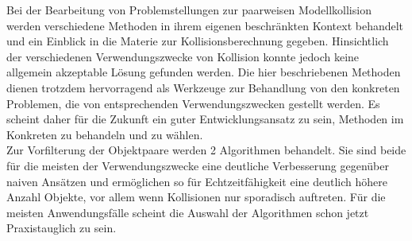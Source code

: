 
Bei der Bearbeitung von Problemstellungen zur paarweisen Modellkollision werden verschiedene Methoden in ihrem eigenen beschränkten Kontext behandelt und ein Einblick in die Materie zur Kollisionsberechnung gegeben. Hinsichtlich der verschiedenen Verwendungszwecke von Kollision konnte jedoch keine allgemein akzeptable Lösung gefunden werden. Die hier beschriebenen Methoden dienen trotzdem hervorragend als Werkzeuge zur Behandlung von den konkreten Problemen, die von entsprechenden Verwendungszwecken gestellt werden. Es scheint daher für die Zukunft ein guter Entwicklungsansatz zu sein, Methoden im Konkreten zu behandeln und zu wählen.\\
Zur Vorfilterung der Objektpaare werden 2 Algorithmen behandelt. Sie sind beide für die meisten der Verwendungszwecke  eine deutliche Verbesserung gegenüber naiven Ansätzen und ermöglichen so für Echtzeitfähigkeit eine deutlich höhere Anzahl Objekte, vor allem wenn Kollisionen nur sporadisch auftreten. Für die meisten Anwendungsfälle scheint die Auswahl der Algorithmen schon jetzt Praxistauglich zu sein.\\
